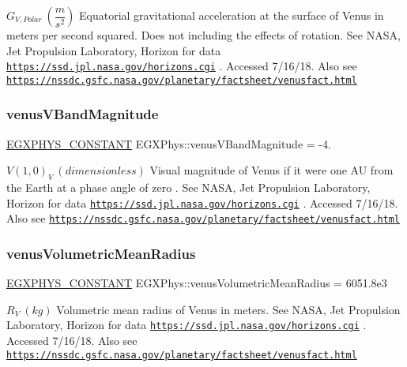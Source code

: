 $ G_{V,Polar} \ (\dfrac{m}{s^2})$ Equatorial gravitational acceleration at the surface of Venus in meters per second squared. Does not including the effects of rotation. See N\+A\+SA, Jet Propulsion Laboratory, Horizon for data \href{https://ssd.jpl.nasa.gov/horizons.cgi}{\tt https\+://ssd.\+jpl.\+nasa.\+gov/horizons.\+cgi} . Accessed 7/16/18. Also see \href{https://nssdc.gsfc.nasa.gov/planetary/factsheet/venusfact.html}{\tt https\+://nssdc.\+gsfc.\+nasa.\+gov/planetary/factsheet/venusfact.\+html} \mbox{\label{group___e_g_x_phys-_constants-_astrophysics-_solar_system-_venus-_bulk_ga7c5dfac5db073d6f546b2aa30e4c6566}} 
\subsubsection{\texorpdfstring{venus\+V\+Band\+Magnitude}{venusVBandMagnitude}}
{\footnotesize\ttfamily \mbox{\hyperlink{group___e_g_x_phys-_constants-_macros_ga76980d288494ce1714c9ac68a95ba702}{E\+G\+X\+P\+H\+Y\+S\+\_\+\+C\+O\+N\+S\+T\+A\+NT}} E\+G\+X\+Phys\+::venus\+V\+Band\+Magnitude = -\/4.}

$ V(1,0)_{V} \ (dimensionless)$ Visual magnitude of Venus if it were one AU from the Earth at a phase angle of zero . See N\+A\+SA, Jet Propulsion Laboratory, Horizon for data \href{https://ssd.jpl.nasa.gov/horizons.cgi}{\tt https\+://ssd.\+jpl.\+nasa.\+gov/horizons.\+cgi} . Accessed 7/16/18. Also see \href{https://nssdc.gsfc.nasa.gov/planetary/factsheet/venusfact.html}{\tt https\+://nssdc.\+gsfc.\+nasa.\+gov/planetary/factsheet/venusfact.\+html} \mbox{\label{group___e_g_x_phys-_constants-_astrophysics-_solar_system-_venus-_bulk_gabd7816eaaceacd8631dffbbc1fdfcb06}} 
\subsubsection{\texorpdfstring{venus\+Volumetric\+Mean\+Radius}{venusVolumetricMeanRadius}}
{\footnotesize\ttfamily \mbox{\hyperlink{group___e_g_x_phys-_constants-_macros_ga76980d288494ce1714c9ac68a95ba702}{E\+G\+X\+P\+H\+Y\+S\+\_\+\+C\+O\+N\+S\+T\+A\+NT}} E\+G\+X\+Phys\+::venus\+Volumetric\+Mean\+Radius = 6051.\+8e3}

$R_{V} \ (kg)$ Volumetric mean radius of Venus in meters. See N\+A\+SA, Jet Propulsion Laboratory, Horizon for data \href{https://ssd.jpl.nasa.gov/horizons.cgi}{\tt https\+://ssd.\+jpl.\+nasa.\+gov/horizons.\+cgi} . Accessed 7/16/18. Also see \href{https://nssdc.gsfc.nasa.gov/planetary/factsheet/venusfact.html}{\tt https\+://nssdc.\+gsfc.\+nasa.\+gov/planetary/factsheet/venusfact.\+html} 